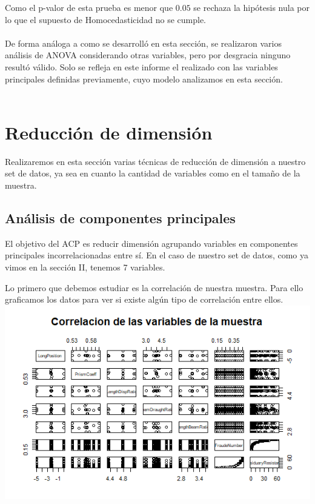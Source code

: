 \documentclass[twoside]{article}
\begin{document}
\begin{multicols}{2}
Como el p-valor de esta prueba es menor que $0.05$ se rechaza la hip\'otesis nula por lo que el supuesto de Homocedasticidad no se cumple.\\\\

De forma an\'aloga a como se desarroll\'o en esta secci\'on, se realizaron varios an\'alisis de ANOVA considerando otras variables, pero por desgracia ninguno result\'o v\'alido. Solo se refleja en este informe el realizado con las variables principales definidas previamente, cuyo modelo analizamos en esta secci\'on.\\\\




\section{Reducci\'on de dimensi\'on}
Realizaremos en esta secci\'on varias t\'ecnicas de reducci\'on de dimensi\'on a nuestro set de datos, ya sea en cuanto la cantidad de variables como en el tama\~no de la muestra.\\


\subsection{An\'alisis de componentes principales}
El objetivo del ACP es reducir dimensi\'on agrupando variables en componentes principales incorrelacionadas entre s\'i. En el caso de nuestro set de datos, como ya vimos en la secci\'on II, tenemos 7 variables.

Lo primero que debemos estudiar es la correlaci\'on de nuestra muestra. Para ello graficamos los datos para ver si existe alg\'un tipo de correlaci\'on entre ellos.\\

\includegraphics[scale = 0.4]{images/pic_21.png} \\


\end{multicols}
\end{document}
